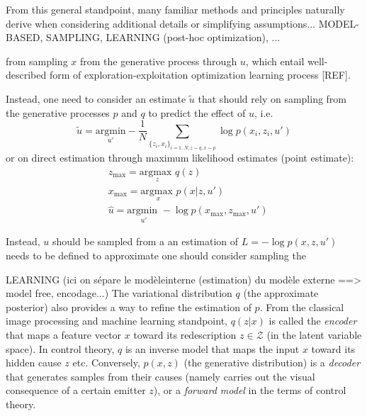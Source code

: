 \documentclass[12pt,twoside,openright]{article}
\begin{document}
	
	From this general standpoint, many familiar methods and principles naturally derive when considering additional details or simplifying assumptions... MODEL-BASED, SAMPLING, LEARNING (post-hoc optimization), ...
	
	{\color{blue} from sampling $x$ from the generative process through $u$, which entail well-described form of exploration-exploitation optimization learning process [REF].}
	
	{\color{magenta} Instead, one need to consider an estimate $\tilde{u}$ that should rely on sampling from the generative processes $p$ and $q$ to 
	predict the effect of $u$,  i.e. 
	$$ \tilde{u} = \underset{u'}{\text{argmin}} - \frac{1}{N} \sum_{\{z_i, x_i\}_{i = 1..N, z \sim q, x \sim p}} \log p(x_i, z_i, u') $$ or on direct estimation through maximum likelihood estimates (point estimate):
	\begin{align*}
	&z_\text{max} = \underset{z}{\text{argmax }}q(z)\\
	&x_\text{max} = \underset{x}{\text{argmax }} p(x|z,u')\\
	&\hat{u} = \underset{u'}{\text{argmin }} - \log p(x_\text{max}, z_\text{max}, u')
	\end{align*}
	}
	
	Instead, $u$ should be sampled from a an estimation of $L = - \log p(x, z, u')$ needs to be defined to approximate one should consider sampling the 
	
	{\color{blue}
	LEARNING (ici on sépare le modèleinterne (estimation) du modèle externe ==> model free, encodage...) The variational distribution $q$ (the approximate posterior) also provides a way to refine the estimation of $p$. From the classical image processing and machine learning standpoint, $q(z|x)$ is called the \emph{encoder} that maps a feature vector $x$ toward its redescription $z \in \mathcal{Z}$ (in the latent variable space). In control theory, $q$ is an inverse model that maps the input $x$ toward its hidden cause $z$ etc. Conversely, $p(x,z)$ (the generative distribution) is a \emph{decoder} that generates samples from their causes (namely carries out the visual consequence of a certain emitter $z$), or a \emph{forward model} in the terms of control theory.}
	
\end{document}
